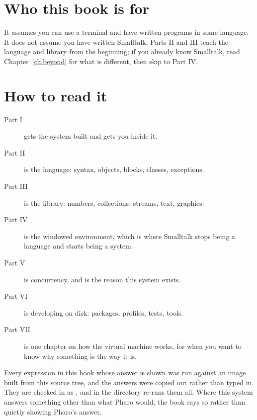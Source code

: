\section{Who this book is for}

It assumes you can use a terminal and have written programs in some language.
It does not assume you have written Smalltalk. Parts II and III teach the
language and library from the beginning; if you already know Smalltalk, read
Chapter~\ref{ch:beyond} for what is different, then skip to Part IV.

\section{How to read it}

\begin{description}
\item[Part I] gets the system built and gets you inside it.
\item[Part II] is the language: syntax, objects, blocks, classes, exceptions.
\item[Part III] is the library: numbers, collections, streams, text, graphics.
\item[Part IV] is the windowed environment, which is where Smalltalk stops
  being a language and starts being a system.
\item[Part V] is concurrency, and is the reason this system exists.
\item[Part VI] is developing on disk: packages, profiles, tests, tools.
\item[Part VII] is one chapter on how the virtual machine works, for when you
  want to know why something is the way it is.
\end{description}

\begin{stnote}
Every expression in this book whose answer is shown was run against an image
built from this source tree, and the answers were copied out rather than typed
in. They are checked in as ,
and  in the  directory re-runs them all. Where
this system answers something other than what Pharo would, the book says so
rather than quietly showing Pharo's answer.
\end{stnote}
